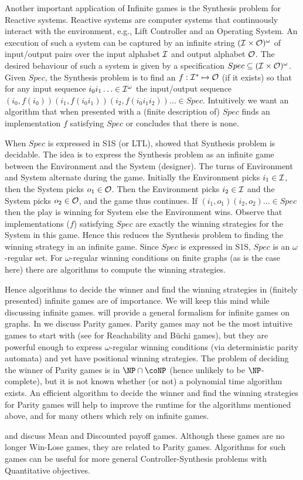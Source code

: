 Another important application of Infinite games is the Synthesis problem for Reactive systems. Reactive systems are computer systems that continuously interact with the environment, e.g., Lift Controller and an Operating System. An execution of such a system can be captured by an infinite string $(\mathcal{I} \times \mathcal{O})^\omega$ of input/output pairs over the input alphabet $\mathcal{I}$ and output alphabet $\mathcal{O}$. The desired behaviour of such a system is given by a specification $Spec \subseteq (\mathcal{I} \times \mathcal{O})^\omega$. Given $Spec$, the Synthesis problem is to find an $f: \mathcal{I}^* \mapsto \mathcal{O}$ (if it exists)  so that for any input sequence $i_0i_1 \ldots \in \mathcal{I}^\omega$ the input/output sequence  $(i_0,f(i_0))(i_1,f(i_0i_1))(i_2,f(i_0i_1i_2)) \ldots \in Spec$. Intuitively we want an algorithm that when presented with a (finite description of) $Spec$ finds an implementation $f$ satisfying $Spec$ or concludes that there is none.

When $Spec$ is expressed in S1S (or LTL), \cite{synthesis} showed that Synthesis problem is decidable. The idea is to express the Synthesis problem as an infinite game between the Environment and the System (designer). The turns of Environment and System alternate during the game. Initially the Environment picks $i_1 \in \mathcal{I}$, then the System picks $o_1 \in \mathcal{O}$. Then the Environment picks $i_2 \in \mathcal{I}$ and the System picks $o_2 \in \mathcal{O}$, and the game thus continues. If $(i_1,o_1)(i_2,o_2) \ldots \in Spec$ then the play is winning for System else the Environment wins. Observe that implementations ($f$) satisfying $Spec$ are exactly the winning strategies for the System in this game. Hence this reduces the Synthesis problem to finding the winning strategy in an infinite game. Since $Spec$ is expressed in S1S, $Spec$ is an $\omega$-regular set. For $\omega$-regular winning conditions on finite graphs (as is the case here) there are algorithms to compute the winning strategies.

Hence algorithms to decide the winner and find the winning strategies in (finitely presented) infinite games are of importance. We will keep this mind while discussing infinite games.  will provide a general formalism for infinite games on graphs. In  we discuss Parity games. Parity games may not be the most intuitive games to start with (see \cite[Chap~2]{thomas2002automata} for Reachability and B\"uchi games), but they are powerful enough to express $\omega$-regular winning conditions (via deterministic parity automata) and yet have positional winning strategies. The problem of deciding the winner of Parity games is in $\NP \cap \coNP$ (hence unlikely to be $\NP$-complete), but it is not known whether (or not) a polynomial time algorithm exists. An efficient algorithm to decide the winner and find the winning strategies for Parity games will help to improve the runtime for the algorithms mentioned above, and for many others which rely on infinite games.

 and  discuss Mean and Discounted payoff games. Although these games are no longer Win-Lose games, they are related to Parity games. Algorithms for such games can be useful for more general Controller-Synthesis problems with Quantitative objectives.

